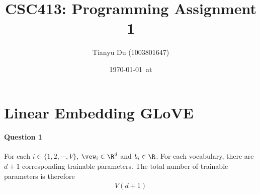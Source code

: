 \documentclass{article}
\title{CSC413: Programming Assignment 1}
\date{\today\ at \currenttime}
\author{Tianyu Du (1003801647)}
\begin{document}
    \maketitle
    \section{Linear Embedding GLoVE}
    \paragraph{Question 1} For each $i \in \{1, 2, \cdots, V\}$, $\vew_i \in \R^d$ and $b_i \in \R$. For each vocabulary, there are $d + 1$ corresponding trainable parameters. The total number of trainable parameters is therefore
    \begin{align}
    	V (d + 1)
    \end{align}
    
\end{document}
